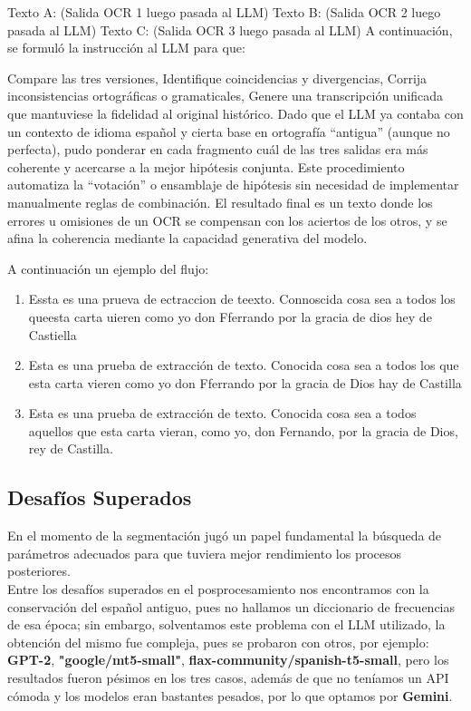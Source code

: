 \documentclass[11pt,a4paper]{article}
\begin{document}
Texto A: (Salida OCR 1 luego pasada al LLM)
Texto B: (Salida OCR 2 luego pasada al LLM)
Texto C: (Salida OCR 3 luego pasada al LLM)
A continuación, se formuló la instrucción al LLM para que:

Compare las tres versiones,
Identifique coincidencias y divergencias,
Corrija inconsistencias ortográficas o gramaticales,
Genere una transcripción unificada que mantuviese la fidelidad al original histórico.
Dado que el LLM ya contaba con un contexto de idioma español y cierta base en ortografía “antigua” (aunque no perfecta), pudo ponderar en cada fragmento cuál de las tres salidas era más coherente y acercarse a la mejor hipótesis conjunta. Este procedimiento automatiza la “votación” o ensamblaje de hipótesis sin necesidad de implementar manualmente reglas de combinación. El resultado final es un texto donde los errores u omisiones de un OCR se compensan con los aciertos de los otros, y se afina la coherencia mediante la capacidad generativa del modelo.

A continuaci\'on un ejemplo del flujo:

\begin{enumerate}
    \item Essta es una prueva de ectraccion de teexto. Connoscida cosa sea a todos los queesta carta uieren como yo don Fferrando por la gracia de dios hey de Castiella
    \item Esta es una prueba de extracción de texto. Conocida cosa sea a todos los que esta carta vieren como yo don Fferrando por la gracia de Dios hay de Castilla
    \item Esta es una prueba de extracción de texto. Conocida cosa sea a todos aquellos que esta carta vieran, como yo, don Fernando, por la gracia de Dios, rey de Castilla.
\end{enumerate}

\subsection{Desafíos Superados}

En el momento de la segmentación jug\'o un papel fundamental la b\'usqueda de par\'ametros adecuados para que tuviera mejor rendimiento los procesos posteriores.\\

Entre los desaf\'ios superados en el posprocesamiento nos encontramos con la conservaci\'on del español antiguo, pues no hallamos un diccionario de frecuencias de esa época; sin embargo, solventamos este problema con el LLM utilizado, la obtención del mismo fue compleja, pues se probaron con otros, por ejemplo: \textbf{GPT-2}, \textbf{"google/mt5-small"}, \textbf{flax-community/spanish-t5-small}, pero los resultados fueron p\'esimos en los tres casos, adem\'as de que no ten\'iamos un API c\'omoda y los modelos eran bastantes pesados, por lo que optamos por \textbf{Gemini}.
\end{document}
